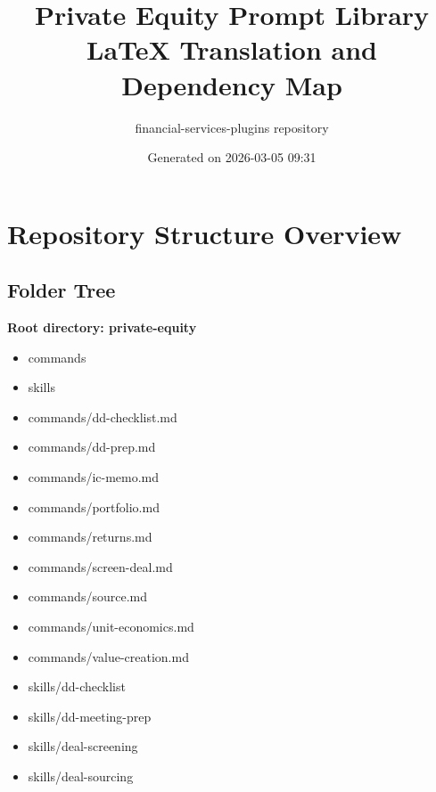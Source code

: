 \documentclass[11pt]{article}
\title{Private Equity Prompt Library\\LaTeX Translation and Dependency Map}
\author{financial-services-plugins repository}
\date{Generated on 2026-03-05 09:31 }
\begin{document}
\maketitle
\tableofcontents
\newpage

\section{Repository Structure Overview}

\subsection{Folder Tree}
\textbf{Root directory: private-equity}
\begin{itemize}[leftmargin=*,itemsep=1pt,topsep=2pt]
\item \hspace*{0.0em}commands
\item \hspace*{0.0em}skills
\item \hspace*{0.9em}commands/dd-checklist.md
\item \hspace*{0.9em}commands/dd-prep.md
\item \hspace*{0.9em}commands/ic-memo.md
\item \hspace*{0.9em}commands/portfolio.md
\item \hspace*{0.9em}commands/returns.md
\item \hspace*{0.9em}commands/screen-deal.md
\item \hspace*{0.9em}commands/source.md
\item \hspace*{0.9em}commands/unit-economics.md
\item \hspace*{0.9em}commands/value-creation.md
\item \hspace*{0.9em}skills/dd-checklist
\item \hspace*{0.9em}skills/dd-meeting-prep
\item \hspace*{0.9em}skills/deal-screening
\item \hspace*{0.9em}skills/deal-sourcing

\end{itemize}
\end{document}
